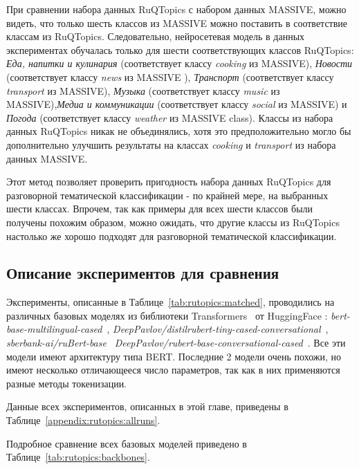 При сравнении набора данных {RuQTopics} с набором данных {MASSIVE}, можно видеть, что только шесть классов из {MASSIVE} можно поставить в соответствие классам из  {RuQTopics}. Следовательно, нейросетевая модель в данных экспериментах обучалась только для шести соответствующих классов {RuQTopics}: \textit{Еда, напитки и кулинария} (соответствует классу \textit{cooking} из {MASSIVE}), \textit{Новости} (соответствует классу \textit{news} из {MASSIVE} ), \textit{Транспорт} (соответствует классу \textit{transport} из {MASSIVE}), \textit{Музыка} (соответствует классу \textit{music} из {MASSIVE}),\textit{Медиа и коммуникации} (соответствует классу \textit{social} из {MASSIVE}) и \textit{Погода} (соответствует классу \textit{weather} из {MASSIVE} class). Классы из набора данных {RuQTopics} никак не объединялись, хотя это предположительно могло бы дополнительно улучшить результаты на классах \textit{cooking} и \textit{transport} из набора данных {MASSIVE}.

Этот метод позволяет проверить пригодность набора данных {RuQTopics} для разговорной тематической классификации - по крайней мере, на выбранных шести классах. Впрочем, так как примеры для всех шести классов были получены похожим образом, можно ожидать, что другие классы из {RuQTopics} настолько же хорошо подходят для разговорной тематической классификации.

\subsection{Описание экспериментов для сравнения}
Эксперименты, описанные в Таблице~\ref{tab:rutopics:matched}, проводились на различных базовых моделях из библиотеки {Transformers}~\cite{huggingface_transformers} от HuggingFace : \textit{bert-base-multilingual-cased}~\cite{multilingual_bert}, \textit{DeepPavlov/distilrubert-tiny-cased-conversational}~\cite{distilrubert}, \textit{sberbank-ai/ruBert-base}~\cite{sbert_base}  \textit{DeepPavlov/rubert-base-conversational-cased}~\cite{rubert}. Все эти модели имеют архитектуру типа BERT. Последние 2 модели очень похожи, но имеют несколько отличающееся число параметров, так как в них применяются разные методы токенизации.

Данные всех экспериментов, описанных в этой главе, приведены в Таблице~\ref{appendix:rutopics:allruns}. 

Подробное сравнение всех базовых моделей приведено в Таблице~\ref{tab:rutopics:backbones}.

